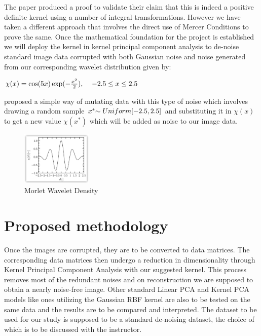 \documentclass[11pt, oneside]{article}   	%
\begin{document}
The paper produced a proof to validate their claim that this is indeed a positive definite kernel using a number of integral transformations. However we have taken a different approach that involves the direct use of Mercer Conditions to prove the same. Once the mathematical foundation for the project is established we will deploy the kernel in kernel principal component analysis to de-noise standard image data corrupted with both Gaussian noise and noise generated from our corresponding wavelet distribution given by: 

\vspace{0.2cm}

\begin{center}
$\chi(x) = \cos(5x)\exp(-\frac{x^2}{2}), \hspace{0.4cm} -2.5 \le x \le 2.5$
\end{center}

\cite{MO} proposed a simple way of mutating data with this type of noise which involves drawing a random sample $x^* \mathtt{\sim} \hspace{0.1cm} Uniform[-2.5,2.5]$ and substituting it in $\chi(x)$ to get a new value $\chi(x^*)$ which will be added as noise to our image data.  

\begin{figure}[h]
    \centering
    \includegraphics[width=0.3\textwidth]{Morlet.jpg}
    \caption{Morlet Wavelet Density}
    \label{fig:mesh1}
\end{figure}


\section{Proposed methodology}

Once the images are corrupted, they are to be converted to data matrices. The corresponding data matrices then undergo a reduction in dimensionality through Kernel Principal Component Analysis with our suggested kernel. This process removes most of the redundant noises and on reconstruction we are supposed to obtain a nearly noise-free image. Other standard Linear PCA and Kernel PCA models like ones utilizing the Gaussian RBF kernel are also to be tested on the same data and the results are to be compared and interpreted. The dataset to be used for our study is supposed to be a standard de-noising dataset, the choice of which is to be discussed with the instructor. 
\end{document}
